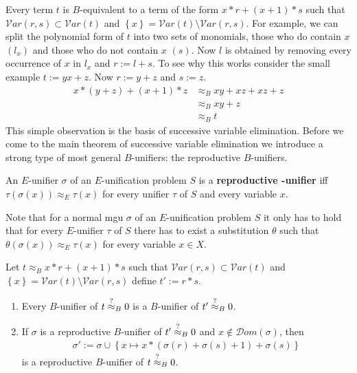 	Every term $t$ is $B$-equivalent to a term of the form $x*r+(x+1)*s$ such that $\mathcal{V}ar(r,s)\subset\mathcal{V}ar(t)$ and $\left\lbrace x\right\rbrace =\mathcal{V}ar(t)\setminus\mathcal{V}ar(r,s)$. For example, we can split the polynomial form of $t$ into two sets of monomials, those who do contain $x$  $\left(l_x\right)$ and those who do not contain $x$ $(s)$. Now $l$ is obtained by removing every occurrence of $x$ in $l_x$ and $r:=l+s$. To see why this works consider the small example $t:=yx+z$. Now $r:=y+z$ and $s:=z$.
	\begin{align*}
		x*(y+z)+(x+1)*z & \approx_B xy+xz+xz+z \\
		                & \approx_B xy+z       \\
		                & \approx_B t          
	\end{align*}
	This simple observation is the basis of successive variable elimination.
	Before we come to the main theorem of successive variable elimination we introduce a strong type of most general $B$-unifiers: the reproductive $B$-unifiers.
	\begin{definition}
		An $E$-unifier $\sigma$ of an $E$-unification problem $S$ is a \textbf{reproductive \mBold-unifier} iff $\tau(\sigma(x))\approx_E\tau(x)$ for every unifier $\tau$ of $S$ and every variable $x$.
	\end{definition}
	Note that for a normal mgu $\sigma$ of an $E$-unification problem $S$ it only has to hold that for every $E$-unifier $\tau$ of $S$ there has to exist a substitution $\theta$ such that $\theta(\sigma(x))\approx_E\tau(x)$ for every variable $x\in X$. 
	\begin{theorem}\label{sucVEli}
		Let $t\approx_B x*r+(x+1)*s$ such that $\mathcal{V}ar(r,s)\subset\mathcal{V}ar(t)$ and $\left\lbrace x\right\rbrace =\mathcal{V}ar(t)\setminus\mathcal{V}ar(r,s)$ define $t':=r*s$.
		\begin{enumerate}
			\item Every $B$-unifier of $t\stackrel{?}{\approx}_B0$ is a $B$-unifier of $t'\stackrel{?}{\approx}_B0$.
			\item If $\sigma$ is a reproductive $B$-unifier of $t'\stackrel{?}{\approx}_B0$ and $x\notin\mathcal{D}om(\sigma)$, then 
			      \begin{align*}
			      	\sigma':=\sigma\cup\left\lbrace x\mapsto x*(\sigma(r)+\sigma(s)+1)+\sigma(s)\right\rbrace 
			      \end{align*}
			      is a reproductive $B$-unifier of $t\stackrel{?}{\approx}_B0$.
		\end{enumerate}
	\end{theorem}
